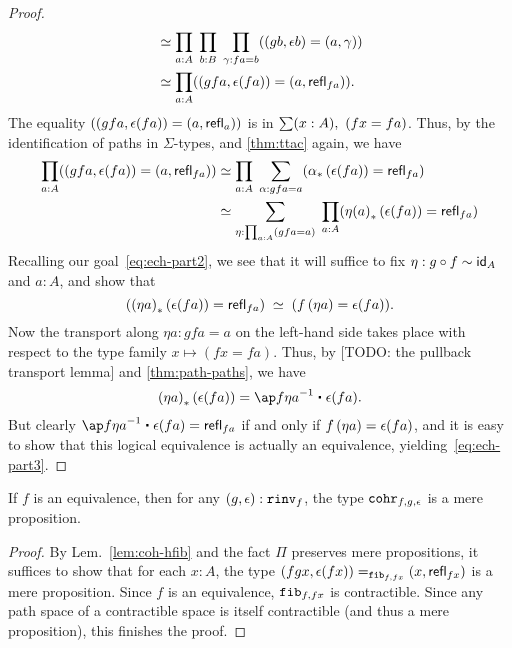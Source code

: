 \begin{proof}
\begin{align*}
    &\simeq \prod_{a:A} \;\prod_{b:B} \;\prod_{\gamma:fa=b} ((gb,\epsilon b)= (a,\gamma))\\
    &\simeq \prod_{a:A}  ((gfa,\epsilon (fa))= (a,\refl {fa})).
  \end{align*}
  The equality $((gfa,\epsilon (fa))= (a,\refl a))$ is in $\sm{x:A} (fx = fa)$.
  Thus, by the identification of paths in $\Sigma$-types, and \autoref{thm:ttac} again, we have
  \begin{align*}
    \prod_{a:A}  ((gfa,\epsilon (fa))= (a,\refl {fa}))
    &\simeq \prod_{a:A}\; \sum_{\alpha:gfa = a} (\trans{\alpha}{\epsilon(fa)} = \refl{fa})\\
    &\simeq \sum_{\eta:\prod_{a:A} (gfa = a)} \; \prod_{a:A} (\trans{\eta(a)}{\epsilon(fa)} = \refl{fa})
  \end{align*}
  Recalling our goal~\eqref{eq:ech-part2}, we see that it will suffice to fix ${\eta: g \circ f \htpy \idfunc[A]}$ and $a:A$, and show that
  \begin{equation}
    \label{eq:ech-part3}
    (\trans{(\eta a)}{\epsilon(fa)} = \refl{fa})
    \;\simeq\;
    (\map{f}{\eta a} = \epsilon(fa)).
  \end{equation}
  Now the transport along $\eta a : gfa = a$ on the left-hand side takes place with respect to the type family $x\mapsto (fx=fa)$.
  Thus, by [TODO: the pullback transport lemma] and \autoref{thm:path-paths}, we have
  \[\trans{(\eta a)}{\epsilon(fa)} = \opp{\ap f {\eta a}} \ct \epsilon(fa).\]
  But clearly $\opp{\ap f {\eta a}} \ct \epsilon(fa) = \refl{fa}$ if and only if $\map{f}{\eta a} = \epsilon(fa)$, and it is easy to show that this logical equivalence is actually an equivalence, yielding~\eqref{eq:ech-part3}.
\end{proof}

\begin{lem}\label{lem:coh-hprop}
If $f$ is an equivalence, then for any $(g,\epsilon) : \rin{f}$, the type $\rcoh{f}{g}{\epsilon}$ is a mere proposition.
\end{lem}
\begin{proof}
By Lem.~\ref{lem:coh-hfib} and the fact $\Pi$ preserves mere propositions, it suffices to show that for each $x:A$, the type $\id[\hfib{f}{fx}]{(fgx,\epsilon(fx))}{(x,\refl{fx})}$ is a mere proposition. Since $f$ is an equivalence, $\hfib{f}{fx}$ is contractible. Since any path space of a contractible space is itself contractible (and thus a mere proposition), this finishes the proof.
\end{proof}

